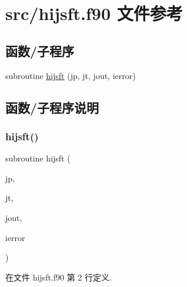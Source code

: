 \hypertarget{hijsft_8f90}{}\section{src/hijsft.f90 文件参考}
\label{hijsft_8f90}
\subsection*{函数/子程序}
\begin{DoxyCompactItemize}
\item 
subroutine \mbox{\hyperlink{hijsft_8f90_a855def5e703c65c2cdf62baa25ce460b}{hijsft}} (jp, jt, jout, ierror)
\end{DoxyCompactItemize}


\subsection{函数/子程序说明}
\mbox{\label{hijsft_8f90_a855def5e703c65c2cdf62baa25ce460b}} 
\subsubsection{\texorpdfstring{hijsft()}{hijsft()}}
{\footnotesize\ttfamily subroutine hijsft (\begin{DoxyParamCaption}\item[{}]{jp,  }\item[{}]{jt,  }\item[{}]{jout,  }\item[{}]{ierror }\end{DoxyParamCaption})}



在文件 hijsft.\+f90 第 2 行定义.

